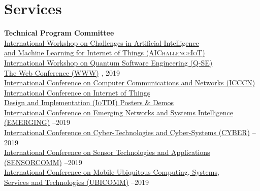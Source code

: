 
\section{\sc Services}
{\bf Technical Program Committee}\\
{\href{https://aichallengeiot.github.io/}{International Workshop on Challenges in Artificial Intelligence \\\mbox{\hspace{0.6cm}} and Machine Learning for Internet of Things (\textsc{AIChallengeIoT})}} \\
{\href{https://q-se.github.io/qse2021/}{International Workshop on Quantum Software Engineering (\textsc{Q-SE})}} \\
{\href{https://www2019.thewebconf.org/}{The Web Conference (\textsc{WWW})}} , 2019\\
{\href{http://www.icccn.org//}{International Conference on Computer Communications and Networks (\textsc{ICCCN})}} \\
{\href{http://conferences.computer.org/iotDI/2019/}{International Conference on Internet of Things \\\mbox{\hspace{0.6cm}} Design and Implementation (\textsc{IoTDI}) Posters \& Demos}} \\
{\href{http://www.iaria.org/conferences2019/EMERGING19.html}{International Conference on Emerging Networks and Systems Intelligence \\\mbox{\hspace{0.6cm}} (\textsc{EMERGING})}} --2019\\
{\href{http://www.iaria.org/conferences2019/CYBER19.html}{International Conference on Cyber-Technologies and Cyber-Systems (\textsc{CYBER})}} --2019\\
{\href{http://www.iaria.org/conferences2019/SENSORCOMM19.html}{International Conference on Sensor Technologies and Applications \\\mbox{\hspace{0.6cm}} (\textsc{SENSORCOMM})}} --2019\\
{\href{http://www.iaria.org/conferences2019/UBICOMM18.html}{International Conference on Mobile Ubiquitous Computing, Systems,\\\mbox{\hspace{0.6cm}} Services and Technologies (\textsc{UBICOMM})}} --2019\\
